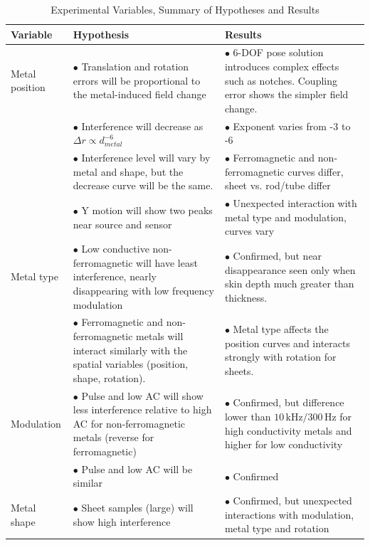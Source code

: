 \documentclass[journal,twoside,web]{ieeecolor}
\begin{document}
\begin{table}[!htbp]
\caption{Experimental Variables, Summary of Hypotheses and Results}
\label{hypothesis}
\setlength{\tabcolsep}{3pt}
\centering
\begin{tabular}{|p{90pt}|p{200pt}|p{200pt}|}
\hline
Variable& 
Hypothesis& 
Results\\
\hline
Metal position& 
$\bullet$ Translation and rotation errors will be proportional to the metal-induced field change &
$\bullet$ 6-DOF pose solution introduces complex effects such as notches. Coupling error shows the simpler field change. \\

$ $&
$\bullet$ Interference will decrease as $\Delta{r} \propto d_{metal}^{-6}$ & 
$\bullet$ Exponent varies from -3 to -6\\

$ $&
$\bullet$ Interference level will vary by metal and shape, but the decrease curve will be the same. &
$\bullet$ Ferromagnetic and non-ferromagnetic curves differ, sheet vs. rod/tube differ \\

$ $&
$\bullet$ Y motion will show two peaks near source and sensor &
$\bullet$ Unexpected interaction with metal type and modulation, curves vary\\
\hline

Metal type& 
$\bullet$ Low conductive non-ferromagnetic will have least interference, nearly disappearing with low frequency modulation& 
$\bullet$ Confirmed, but near disappearance seen only when skin depth much greater than thickness.\\
$ $&
$\bullet$ Ferromagnetic and non-ferromagnetic metals will interact similarly with the spatial variables (position, shape, rotation). &
$\bullet$ Metal type affects the position curves and interacts strongly with rotation for sheets.\\
\hline

Modulation& 
$\bullet$ Pulse and low AC will show less interference relative to high AC for non-ferromagnetic metals (reverse for ferromagnetic)& 
$\bullet$ Confirmed, but difference lower than $10\,\mathrm{kHz}/300\,\mathrm{Hz}$ for high conductivity metals and higher for low conductivity\\
$ $&
$\bullet$ Pulse and low AC will be similar &
$\bullet$ Confirmed\\
\hline

Metal shape& 
$\bullet$ Sheet samples (large) will show high interference& 
$\bullet$ Confirmed, but unexpected interactions with modulation, metal type and rotation\\


\end{tabular}
\end{table}
\end{document}
